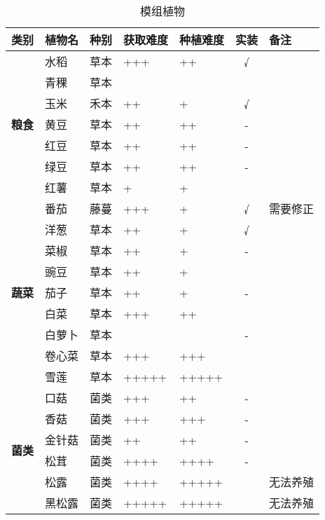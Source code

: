 \begin{table}[H]
    \centering
    \caption{模组植物}
    \label{table:模组植物}
    \setlength{\tabcolsep}{4mm}
    \begin{tabular}{l|ll|ll|cl}
        \toprule
        \textbf{类别} &\textbf{植物名} &  \textbf{种别} & \textbf{获取难度}  & \textbf{种植难度}  & \textbf{实装} & \textbf{备注} \\
        \midrule
        \multirow{7}{*}{\textbf{粮食}}& 水稻   & 草本  & +++    & ++ & √ &         \\
        & 青稞 & 草本 & & & & \\
        & 玉米   & 禾本  & ++    & + & √ &         \\
        & 黄豆   & 草本  & ++    & ++ & - &         \\
        & 红豆   & 草本  & ++    & ++ & - &         \\
        & 绿豆   & 草本  & ++    & ++ & - &         \\
        & 红薯   & 草本  & +    & + &  &         \\
        \midrule
        \multirow{9}{*}{\textbf{蔬菜}}& 番茄   & 藤蔓  & +++    & + &  √ &  需要修正  \\
        & 洋葱   & 草本  & ++    & + & √ &         \\
        & 菜椒   & 草本  & ++    & + & -  &        \\
        & 豌豆   & 草本  & ++    & + &   &        \\
        & 茄子   & 草本  & ++    & + & - &         \\
        & 白菜   & 草本  & +++    & ++ &   &        \\
        & 白萝卜   & 草本  &    &  & - &        \\
        & 卷心菜   & 草本  & +++    & +++ &   &        \\
        & 雪莲   & 草本  & +++++    & +++++ &  &         \\
        \midrule
        \multirow{6}{*}{\textbf{菌类}}& 口菇   & 菌类  & +++    & ++ & - &   \\
        & 香菇   & 菌类  & +++    & +++ & - &        \\
        & 金针菇   & 菌类  & ++    & ++ & - &        \\
        & 松茸   & 菌类  & ++++    & ++++ & -  &       \\
        & 松露   & 菌类  & ++++    & +++++ &  & 无法养殖    \\
        & 黑松露   & 菌类  & +++++    & +++++ &  & 无法养殖   \\

\end{tabular}
\end{table}
